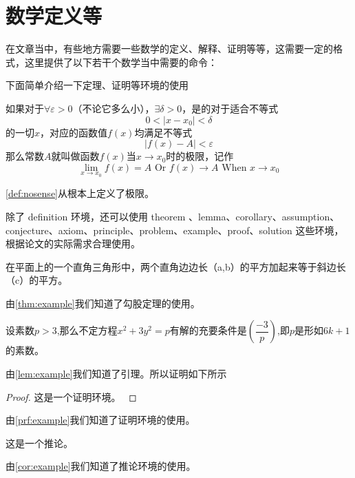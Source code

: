 \section{数学定义等}

在文章当中，有些地方需要一些数学的定义、解释、证明等等，这需要一定的格式，这里提供了以下若干个数学当中需要的命令：

下面简单介绍一下定理、证明等环境的使用
\begin{definition}
	如果对于$\forall\varepsilon>0$（不论它多么小），$\exists\delta>0$，是的对于适合不等式
    \begin{equation}
        0<\left|x-x_{0}\right|<\delta
    \end{equation}
    的一切$x$，对应的函数值$f(x)$均满足不等式
    \begin{equation}
        \left|f(x)-A\right|<\varepsilon
    \end{equation}
    那么常数$A$就叫做函数$f(x)$当$x\rightarrow{x_{0}}$时的极限，记作
    \begin{equation}
        \lim\limits_{x\rightarrow{x_{0}}}f(x)=A\text{  Or } f(x)\rightarrow{A}\text{ When }x\rightarrow{x_{0}}
    \end{equation}
	\label{def:nosense}
\end{definition}
\cref{def:nosense}从根本上定义了极限。

除了 definition 环境，还可以使用 theorem 、lemma、corollary、assumption、conjecture、axiom、principle、problem、example、proof、solution 这些环境，根据论文的实际需求合理使用。

\begin{theorem}[勾股定理]
	在平面上的一个直角三角形中，两个直角边边长（a,b）的平方加起来等于斜边长（c）的平方。
	\label{thm:example}
\end{theorem}
由\cref{thm:example}我们知道了勾股定理的使用。

\begin{lemma}
	设素数$p>3$,那么不定方程$x^{2}+3y^{2}=p$有解的充要条件是$\left(\dfrac{-3}{p}\right)$,即$p$是形如$6k+1$的素数。
	\label{lem:example}
\end{lemma}
由\cref{lem:example}我们知道了引理。所以证明如下所示


\begin{proof}
	这是一个证明环境。
	\label{prf:example}
\end{proof}
由\cref{prf:example}我们知道了证明环境的使用。

\begin{corollary}
	这是一个推论。
	\label{cor:example}
\end{corollary}
由\cref{cor:example}我们知道了推论环境的使用。
 
